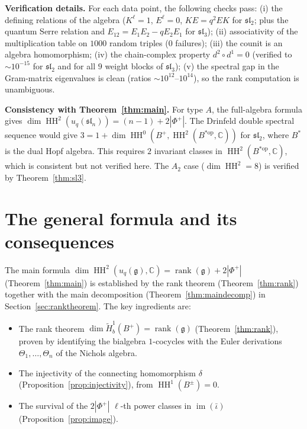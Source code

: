 \documentclass[11pt,letterpaper]{amsart}
\theoremstyle{plain}
\theoremstyle{definition}
\theoremstyle{remark}
\newcommand{\HH}{\operatorname{HH}}
\newcommand{\CC}{\mathbb{C}}
\begin{document}
\textbf{Verification details.} For each data point, the following checks pass: (i) the defining relations of the algebra ($K^\ell = 1$, $E^\ell = 0$, $KE = q^2 EK$ for $\mathfrak{sl}_2$; plus the quantum Serre relation and $E_{12} = E_1 E_2 - q E_2 E_1$ for $\mathfrak{sl}_3$); (ii) associativity of the multiplication table on $1000$ random triples ($0$ failures); (iii) the counit is an algebra homomorphism; (iv) the chain-complex property $d^2 \circ d^1 = 0$ (verified to $\sim 10^{-15}$ for $\mathfrak{sl}_2$ and for all $9$ weight blocks of $\mathfrak{sl}_3$); (v) the spectral gap in the Gram-matrix eigenvalues is clean (ratios $\sim 10^{12}$--$10^{14}$), so the rank computation is unambiguous.

\textbf{Consistency with Theorem~\ref{thm:main}.} For type $A$, the full-algebra formula gives $\dim \HH^2(u_q(\mathfrak{sl}_n)) = (n-1) + 2|\Phi^+|$. The Drinfeld double spectral sequence would give $3 = 1 + \dim \HH^0(B^+, \HH^2(B^{*\mathrm{op}}, \CC))$ for $\mathfrak{sl}_2$, where $B^*$ is the dual Hopf algebra. This requires $2$ invariant classes in $\HH^2(B^{*\mathrm{op}}, \CC)$, which is consistent but not verified here. The $A_2$ case ($\dim \HH^2 = 8$) is verified by Theorem~\ref{thm:sl3}.

\section{The general formula and its consequences}
\label{sec:general}

The main formula $\dim \HH^2(u_q(\mathfrak{g}), \CC) = \operatorname{rank}(\mathfrak{g}) + 2|\Phi^+|$ (Theorem~\ref{thm:main}) is established by the rank theorem (Theorem~\ref{thm:rank}) together with the main decomposition (Theorem~\ref{thm:maindecomp}) in Section~\ref{sec:ranktheorem}. The key ingredients are:
\begin{itemize}
\item The rank theorem $\dim \tilde{H}^1_b(B^+) = \operatorname{rank}(\mathfrak{g})$ (Theorem~\ref{thm:rank}), proven by identifying the bialgebra $1$-cocycles with the Euler derivations $\Theta_1, \ldots, \Theta_n$ of the Nichols algebra.
\item The injectivity of the connecting homomorphism $\delta$ (Proposition~\ref{prop:injectivity}), from $\HH^1(B^\pm) = 0$.
\item The survival of the $2|\Phi^+|$ $\ell$-th power classes in $\operatorname{im}(\bar\iota)$ (Proposition~\ref{prop:image}).
\end{itemize}
\end{document}
